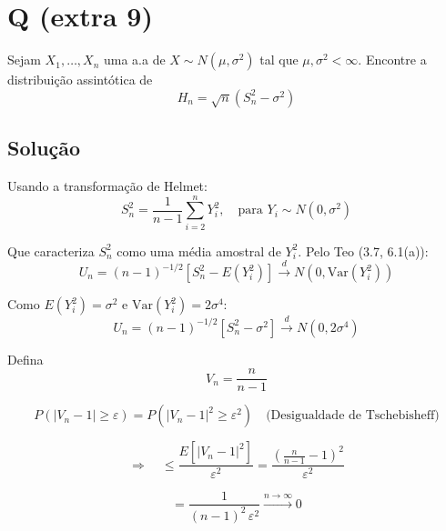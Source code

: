 \section*{Q (extra 9)}

Sejam $X_1, \ldots, X_n$ uma a.a de $X \sim N(\mu, \sigma^2)$ tal que $\mu, \sigma^2 < \infty$.  
Encontre a distribuição assintótica de
\begin{equation}
    H_n = \sqrt{n} \left( S_n^2 - \sigma^2 \right)
\end{equation}

\subsection*{Solução}

Usando a transformação de Helmet:
\begin{equation}
    S_n^2 = \frac{1}{n-1} \sum_{i=2}^n Y_i^2, \quad \text{para } Y_i \sim N(0, \sigma^2)
\end{equation}

Que caracteriza $S_n^2$ como uma média amostral de $Y_i^2$.  
Pelo Teo (3.7, 6.1(a)):
\begin{equation}
    U_n = (n-1)^{-1/2} \left[ S_n^2 - E(Y_i^2) \right] \xrightarrow{d} N\left(0, \mathrm{Var}(Y_i^2)\right)
\end{equation}

Como $E(Y_i^2) = \sigma^2$ e $\mathrm{Var}(Y_i^2) = 2\sigma^4$:
\begin{equation}
    U_n = (n-1)^{-1/2} \left[ S_n^2 - \sigma^2 \right] \xrightarrow{d} N\left(0, 2\sigma^4\right)
\end{equation}

Defina
\begin{equation}
    V_n = \frac{n}{n-1}
\end{equation}

\begin{equation}
    P\left( |V_n - 1| \geq \varepsilon \right) = P\left( |V_n - 1|^2 \geq \varepsilon^2 \right) \quad \text{(Desigualdade de Tschebisheff)}
\end{equation}

\begin{equation}
    \Rightarrow \quad \leq \frac{E\left[ |V_n - 1|^2 \right]}{\varepsilon^2} = \frac{\left( \frac{n}{n-1} - 1 \right)^2}{\varepsilon^2}
\end{equation}

\begin{equation}
    = \frac{1}{(n-1)^2 \, \varepsilon^2} \xrightarrow{n \to \infty} 0
\end{equation}